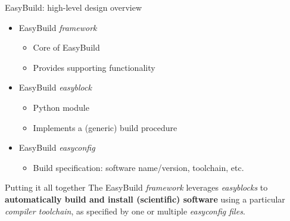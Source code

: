\documentclass[10pt,xcolor={usenames,dvipsnames}]{beamer}
\begin{document}
\begin{frame}{EasyBuild: high-level design overview}
\begin{itemize}
    \item
        EasyBuild \emph{framework}
        \begin{itemize}
            \item
                Core of EasyBuild
            \item
                Provides supporting functionality
        \end{itemize}
    \item
        EasyBuild \emph{easyblock}
        \begin{itemize}
            \item
                Python module
            \item
                Implements a (generic) build procedure
        \end{itemize}
    \item
        EasyBuild \emph{easyconfig}
        \begin{itemize}
            \item
                Build specification: software name/version, toolchain, etc.
        \end{itemize}
\end{itemize}

\medskip\quad\quad
\begin{minipage}{0.9\textwidth}
    \begin{block}{Putting it all together}
        The EasyBuild \emph{framework} leverages \emph{easyblocks} to
        \textbf{automatically build and install (scientific) software} using a
        particular \emph{compiler toolchain}, as specified by one or multiple
        \emph{easyconfig files}.
    \end{block}
\end{minipage}
\end{frame}

\end{document}
